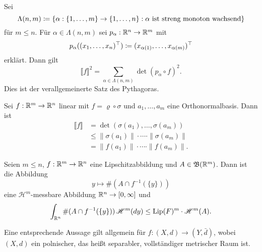 \documentclass[a4paper,twoside,DIV15,BCOR12mm]{scrbook}
\newcommand{\borel}{\mathfrak B}
\newcommand{\HM}{\mathscr H}
\DeclareMathOperator{\Lip}{Lip}
\begin{document}
\begin{bemerkungen}
\item Sei
\[
\Lambda(n,m) \da \{\alpha:\{1,\ldots,m\} \to \{1,\ldots,n\} : \text{$\alpha$ ist streng monoton wachsend}\}
\]
für $m\le n$. Für $\alpha \in\Lambda(n,m)$ sei $p_\alpha: \mathbb{R}^n \to\mathbb{R}^m$ mit
\[
p_\alpha( (x_1,\ldots,x_n)^\top ) \da (x_{\alpha(1)},\ldots,x_{\alpha(m)})^\top
\]
erklärt. Dann gilt
\[
\llbracket f \rrbracket^2 = \sum_{\alpha\in \Lambda(n,m)}  \det(p_\alpha \circ f)^2.
\]
Dies ist der verallgemeinerte Satz des Pythagoras.
\item Sei $f:\mathbb{R}^m \to \mathbb{R}^n$ linear mit $f=\varrho\circ\sigma$ und $a_1,\ldots,a_m$ eine Orthonormalbasis. Dann ist
\begin{align*}
\llbracket f \rrbracket 
&= \det(\sigma(a_1),\ldots,\sigma(a_m)) \\
&\le \|\sigma(a_1)\|\cdot \cdots \cdot \|\sigma(a_m)\| \\
&= \|f(a_1)\|\cdot \cdots \cdot \|f(a_m)\|.
\end{align*}
\end{bemerkungen}

\begin{proposition}
\label{prop:3.5}
Seien $m\le n$, $f:\mathbb{R}^m\to\mathbb{R}^n$ eine Lipschitzabbildung und $A\in \borel(\MdR^m)$. Dann ist die Abbildung
\[
y\mapsto \#(A\cap f^{-1}(\{y\}))
\]
eine $\HM^m$-messbare Abbildung $\mathbb{R}^n\to [0,\infty]$ und
\[
\int_{\MdR^n} \#(A\cap f^{-1}(\{y\}))\, \HM^m(dy) \le \Lip(F)^m \cdot \HM^m(A).
\]
\end{proposition}

\begin{bemerkung}
Eine entsprechende Aussage gilt allgemein für $f:(X,d)\to (Y,\bar d)$, wobei $(X,d)$ ein polnischer, das heißt separabler, vollständiger metrischer Raum ist.
\end{bemerkung}
\end{document}
